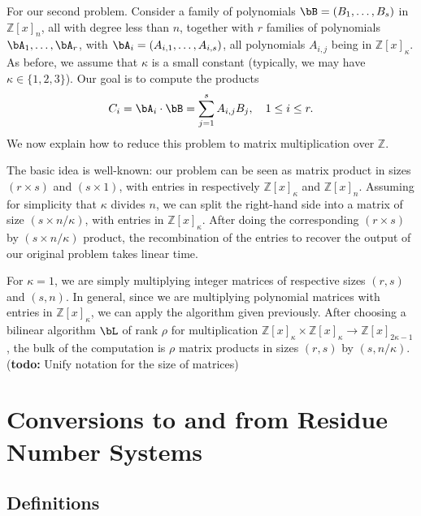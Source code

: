 \documentclass[acmtoms]{acmsmall}
\def\Z{\mathbb{Z}}
\newcommand{\todo}[1]{(\textbf{todo:} #1)}
\begin{document}
\medskip

For our second problem. Consider a family of polynomials
$\bB=(B_1,\dots,B_s)$ in $\Z[x]_n$, all with degree less than $n$,
together with $r$ families of polynomials $\bA_1,\dots,\bA_r$, with
$\bA_i=(A_{i,1},\dots,A_{i,s})$, all polynomials $A_{i,j}$ being in
$\Z[x]_\kappa$. As before, we assume that $\kappa$ is a small constant
(typically, we may have $\kappa \in \{1,2,3\}$). Our goal is to
compute the products
$$C_i = \bA_i \cdot \bB = \sum_{j=1}^s A_{i,j} B_j,\quad 1 \le i \le
r.$$ We now explain how to reduce
this problem to matrix multiplication over $\Z$.

The basic idea is well-known: our problem can be seen as matrix
product in sizes $(r \times s)$ and $(s \times 1)$, with entries in
respectively $\Z[x]_\kappa$ and $\Z[x]_n$. Assuming for simplicity
that $\kappa$ divides $n$, we can split the right-hand side into a
matrix of size $(s \times n/\kappa)$, with entries in $\Z[x]_\kappa$.
After doing the corresponding $(r \times s)$ by $(s \times n/\kappa)$
product, the recombination of the entries to recover the output of
our original problem takes linear time. 

For $\kappa=1$, we are simply multiplying integer matrices of
respective sizes $(r,s)$ and $(s,n)$. In general, since we are
multiplying polynomial matrices with entries in $\Z[x]_\kappa$, we can
apply the algorithm given previously. After choosing a bilinear
algorithm $\bL$ of rank $\rho$ for
multiplication $\Z[x]_\kappa \times \Z[x]_\kappa
\to\Z[x]_{2\kappa-1}$, the bulk of the computation is 
$\rho$ matrix products in sizes $(r, s)$ by $(s, n/\kappa)$.
\todo{Unify notation for the size of matrices}


\section{Conversions to and from Residue Number Systems}


\subsection{Definitions}
\end{document}
